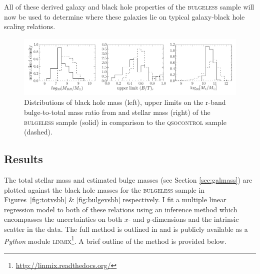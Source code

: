 {All of these derived galaxy and black hole properties of the \textsc{bulgeless} sample will now be used to determine where these galaxies lie on typical galaxy-black hole scaling relations.

\begin{figure}[t]
\centering
\includegraphics[width=\textwidth]{agn/diskdom_mbh_btot_stellar_mass_distributions.pdf}
\caption[Galaxy and black hole properties of the \textsc{bulgeless} sample in comparison to the \textsc{qsocontrol} sample]{Distributions of black hole mass (left), upper limits on the r-band bulge-to-total mass ratio from \citet[][middle]{simard11} and stellar mass (right) of the \textsc{bulgeless} sample (solid) in comparison to the \textsc{qsocontrol} sample (dashed).}
\label{fig:discdomdist}
\end{figure}



%
%  
\subsection{Results}\label{sec:intresults}
%
% 



The total stellar mass and estimated bulge masses (see Section \ref{sec:galmass}) are plotted against the black hole masses for the \textsc{bulgeless} sample in Figures~\ref{fig:totvsbh} \& \ref{fig:bulgevsbh} respectively. I fit a multiple linear regression model to both of these relations using an inference method which encompasses the uncertainties on both $x$- and $y$-dimensions and the intrinsic scatter in the data. The full method is outlined in \citet{kelly07} and is publicly available as a \emph{Python} module \textsc{linmix}\footnote{\url{http://linmix.readthedocs.org/}}. A brief outline of the method is provided below. 

}
